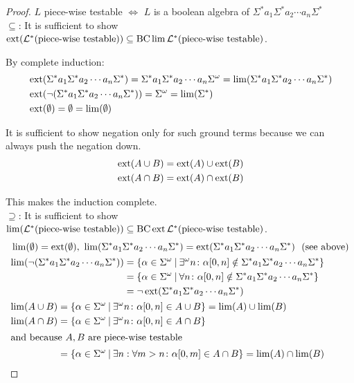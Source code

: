 \begin{proof}

$L$ piece-wise testable $\Leftrightarrow$ $L$ is a boolean algebra of $\Sigma^* a_1 \Sigma^* a_2 \dotsb a_n \Sigma^*$
\\

$\subseteq$: It is sufficient to show $\operatorname{ext}(\mathcal{L}^* (\textup{\textrm{piece-wise testable}})) \subseteq \operatorname{BC} \lim \mathcal{L}^* (\textup{\textrm{piece-wise testable}})$.

By complete induction:
\begin{align*}
& \operatorname{ext}(\Sigma^* a_1 \Sigma^* a_2 \dotsb a_n \Sigma^*) = \Sigma^* a_1 \Sigma^* a_2 \dotsb a_n \Sigma^\omega = \lim(\Sigma^* a_1 \Sigma^* a_2 \dotsb a_n \Sigma^*) \\
& \operatorname{ext}( \neg ( \Sigma^* a_1 \Sigma^* a_2 \dotsb a_n \Sigma^* )) = \Sigma^\omega = \lim( \Sigma^* ) \\
& \operatorname{ext}( \emptyset ) = \emptyset = \lim(\emptyset)
\end{align*}

It is sufficient to show negation only for such ground terms because we can always push the negation down.
\begin{align*}
& \operatorname{ext}(A \cup B) = \operatorname{ext}(A) \cup \operatorname{ext}(B) \\
& \operatorname{ext}(A \cap B) = \operatorname{ext}(A) \cap \operatorname{ext}(B)
\end{align*}

This makes the induction complete.
\\

$\supseteq$: It is sufficient to show $\lim(\mathcal{L}^* (\textup{\textrm{piece-wise testable}})) \subseteq \operatorname{BC} \operatorname{ext} \mathcal{L}^* (\textup{\textrm{piece-wise testable}})$.
\begin{align*}
& \lim(\emptyset) = \ext(\emptyset), \ \lim(\Sigma^* a_1 \Sigma^* a_2 \dotsb a_n \Sigma^*) = \ext(\Sigma^* a_1 \Sigma^* a_2 \dotsb a_n \Sigma^*) \ \ \text{(see above)} \\
& \begin{aligned}
\lim( \neg ( \Sigma^* a_1 \Sigma^* a_2 \dotsb a_n \Sigma^* ) ) & = \Set{ \alpha \in \Sigma^\omega }{ \exists^\omega n \colon \alpha [0,n] \notin \Sigma^* a_1 \Sigma^* a_2 \dotsb a_n \Sigma^* } \\
& = \Set{ \alpha \in \Sigma^\omega }{ \forall n \colon \alpha [0,n] \notin \Sigma^* a_1 \Sigma^* a_2 \dotsb a_n \Sigma^* } \\
& = \neg \ext( \Sigma^* a_1 \Sigma^* a_2 \dotsb a_n \Sigma^* )
\end{aligned} \\
& \begin{aligned}
\lim(A \cup B) & = \Set{ \alpha \in \Sigma^\omega }{ \exists^\omega n \colon \alpha[0,n] \in A \cup B } = \lim(A) \cup \lim(B) \\
\lim(A \cap B) & = \Set{ \alpha \in \Sigma^\omega }{ \exists^\omega n \colon \alpha[0,n] \in A \cap B } \\
\intertext{and because $A,B$ are piece-wise testable}
& = \Set{ \alpha \in \Sigma^\omega }{ \exists n : \forall m > n \colon \alpha[0,m] \in A \cap B } = \lim(A) \cap \lim(B)
\end{aligned}
\end{align*}

\end{proof}



